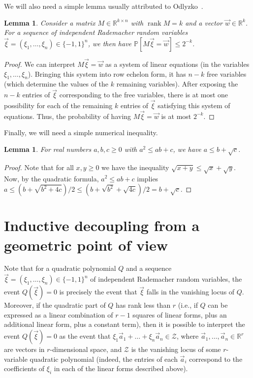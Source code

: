 \documentclass[english]{article}
\newtheorem{lemma}[theorem]{Lemma}
\theoremstyle{remark}
\numberwithin{equation}{section}
\numberwithin{figure}{section}
\newcommand{\PP}{\mathbb{P}}
\newcommand{\RR}{\mathbb{R}}
\newcommand{\rank}{\operatorname{rank}}
\newcommand{\mc}{\mathcal}
\begin{document}
We will also need a simple lemma usually attributed to Odlyzko~\cite{Odl88}.

\begin{lemma}\label{lem:odlyzko}
Consider a matrix $M\in \RR^{k\times n}$ with $\rank M=k$ and a vector $\vec{w}\in \RR^k$. For a sequence of independent Rademacher random variables $\vec{\xi}=(\xi_{1},\dots,\xi_{n})\in\{-1,1\}^n$, we then have $\PP[M\vec{\xi}=\vec{w}]\le 2^{-k}$.
\end{lemma}

\begin{proof}
We can interpret $M\vec{\xi}=\vec{w}$ as a system of linear equations (in the variables $\xi_{1},\dots,\xi_{n}$). Bringing this system into row echelon form, it has $n-k$ free variables (which determine the values of the $k$ remaining variables). After exposing the $n-k$ entries of $\vec{\xi}$ corresponding to the free variables, there is at most one possibility for each of the remaining $k$ entries of $\vec{\xi}$ satisfying this system of equations. Thus, the probability of having $M\vec{\xi}=\vec{w}$ is at most $2^{-k}$.
\end{proof}

Finally, we will need a simple numerical inequality.
\begin{lemma}\label{lem:simple-inequality}
For real numbers $a,b,c\ge0$ with $a^{2}\le ab+c$, we have $a\le b+\sqrt{c}$.
\end{lemma}

\begin{proof}Note that for all $x,y\ge 0$ we have the inequality $\sqrt{x+y}\le\sqrt{x}+\sqrt{y}$. Now, by the quadratic formula, $a^{2}\le ab+c$ implies $a\le(b+\sqrt{b^{2}+4c})/2\le (b+\sqrt{b^2}+\sqrt{4c})/2=b+\sqrt{c}$.
\end{proof}

\section{Inductive decoupling from a geometric point of view}\label{sec:geometric}

Note that for a quadratic polynomial $Q$ and a sequence $\vec{\xi}=(\xi_{1},\dots,\xi_{n})\in\{-1,1\}^n$ of independent Rademacher random variables, the event $Q(\vec \xi)=0$ is precisely the event that $\vec \xi$ falls in the vanishing locus of $Q$. Moreover, if the quadratic part of $Q$ has rank less than $r$ (i.e., if $Q$ can be expressed as a linear combination of $r-1$ squares of linear forms, plus an additional linear form, plus a constant term), then it is possible to interpret the event $Q(\vec \xi)=0$ as the event that $\xi_1\vec a_1+\dots +\xi_n\vec a_n\in \mathcal Z$, where $\vec a_1,\dots,\vec a_n\in \RR^{r}$ are vectors in $r$-dimensional space, and $\mc Z$ is the vanishing locus of some $r$-variable quadratic polynomial (indeed, the entries of each $\vec a_i$ correspond to the coefficients of $\xi_i$ in each of the linear forms described above).
\end{document}
